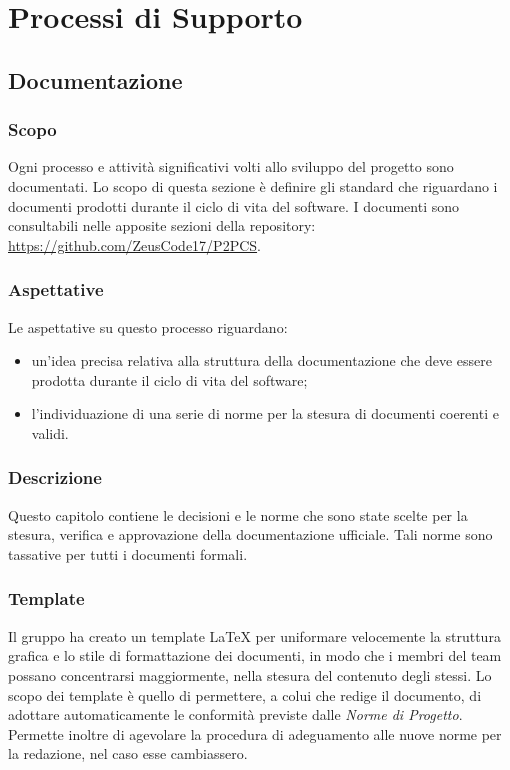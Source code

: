 \section{Processi di Supporto}
\subsection{Documentazione}
	\subsubsection{Scopo}
	Ogni processo e attività significativi volti allo sviluppo del progetto sono documentati. Lo scopo di questa sezione è definire gli standard che riguardano i documenti prodotti durante il ciclo di vita del software.
	I documenti sono consultabili nelle apposite sezioni della repository\glo:\\ \url{https://github.com/ZeusCode17/P2PCS}. 		
	\subsubsection{Aspettative}
	Le aspettative su questo processo riguardano:
	\begin{itemize}
		\item un'idea precisa relativa alla struttura della documentazione che deve essere prodotta durante il ciclo di vita del software;
		\item l'individuazione di una serie di norme per la stesura di documenti coerenti e validi.
	\end{itemize}
	\subsubsection{Descrizione}
	Questo capitolo contiene le decisioni e le norme che sono state scelte per la
	stesura, verifica e approvazione della documentazione ufficiale.  Tali norme  sono  tassative  per  tutti  i  documenti  formali.

	\subsubsection{Template}
	Il gruppo ha creato un template \LaTeX{} per uniformare velocemente la struttura grafica e lo stile di formattazione dei documenti, in modo che i membri del team possano concentrarsi maggiormente, nella stesura del contenuto degli stessi. Lo scopo dei template è quello di permettere, a colui che redige il documento, di adottare automaticamente le conformità previste dalle \textit{Norme di Progetto}. Permette inoltre di agevolare la procedura di adeguamento alle nuove norme per la redazione, nel caso esse cambiassero.
